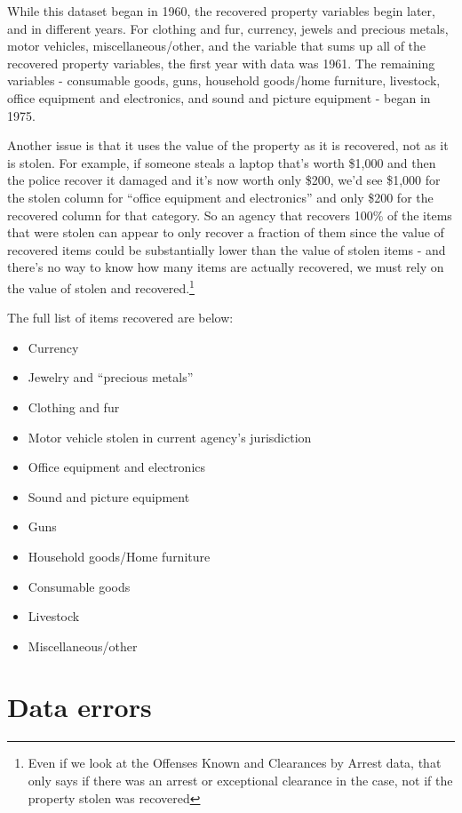 \documentclass[
]{krantz}
\providecommand{\tightlist}{%
  \setlength{\itemsep}{0pt}\setlength{\parskip}{0pt}}
\begin{document}
While this dataset began in 1960, the recovered property
variables begin later, and in different years. For clothing
and fur, currency, jewels and precious metals, motor
vehicles, miscellaneous/other, and the variable that sums up
all of the recovered property variables, the first year with
data was 1961. The remaining variables - consumable goods,
guns, household goods/home furniture, livestock, office
equipment and electronics, and sound and picture equipment -
began in 1975.

Another issue is that it uses the value of the property as
it is recovered, not as it is stolen. For example, if
someone steals a laptop that's worth \$1,000 and then the
police recover it damaged and it's now worth only \$200,
we'd see \$1,000 for the stolen column for ``office
equipment and electronics'' and only \$200 for the recovered
column for that category. So an agency that recovers 100\%
of the items that were stolen can appear to only recover a
fraction of them since the value of recovered items could be
substantially lower than the value of stolen items - and
there's no way to know how many items are actually
recovered, we must rely on the value of stolen and
recovered.\footnote{Even if we look at the Offenses Known
  and Clearances by Arrest data, that only says if there was
  an arrest or exceptional clearance in the case, not if the
  property stolen was recovered}

The full list of items recovered are below:

\begin{itemize}
\tightlist
\item
  Currency
\item
  Jewelry and ``precious metals''
\item
  Clothing and fur
\item
  Motor vehicle stolen in current agency's jurisdiction
\item
  Office equipment and electronics
\item
  Sound and picture equipment
\item
  Guns
\item
  Household goods/Home furniture
\item
  Consumable goods
\item
  Livestock
\item
  Miscellaneous/other
\end{itemize}

\section{Data errors}\label{data-errors}
\end{document}
